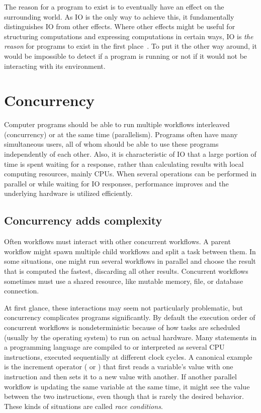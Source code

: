 The reason for a program to exist is to eventually have an effect on the surrounding world. As IO is the only way to achieve this, it fundamentally distinguishes IO from other effects. Where other effects might be useful for structuring computations and expressing computations in certain ways, IO is \emph{the reason} for programs to exist in the first place~\cite{akward-squad}. To put it the other way around, it would be impossible to detect if a program is running or not if it would not be interacting with its environment.



\section{Concurrency}
Computer programs should be able to run multiple workflows interleaved (concurrency) or at the same time (parallelism). Programs often have many simultaneous users, all of whom should be able to use these programs independently of each other. Also, it is characteristic of IO that a large portion of time is spent waiting for a response, rather than calculating results with local computing resources, mainly CPUs. When several operations can be performed in parallel or while waiting for IO responses, performance improves and the underlying hardware is utilized efficiently.


\subsection{Concurrency adds complexity}
Often workflows must interact with other concurrent workflows. A parent workflow might spawn multiple child workflows and split a task between them. In some situations, one might run several workflows in parallel and choose the result that is computed the fastest, discarding all other results. Concurrent workflows sometimes must use a shared resource, like mutable memory, file, or database connection.

At first glance, these interactions may seem not particularly problematic, but concurrency complicates programs significantly. By default the execution order of concurrent workflows is nondeterministic because of how tasks are scheduled (usually by the operating system) to run on actual hardware. Many statements in a programming language are compiled to or interpreted as several CPU instructions, executed sequentially at different clock cycles. A canonical example is the increment operator (\inlinecode{++} or \inlinecode{+=}) that first reads a variable's value with one instruction and then sets it to a new value with another. If another parallel workflow is updating the same variable at the same time, it might see the value between the two instructions, even though that is rarely the desired behavior. These kinds of situations are called \emph{race conditions}.

